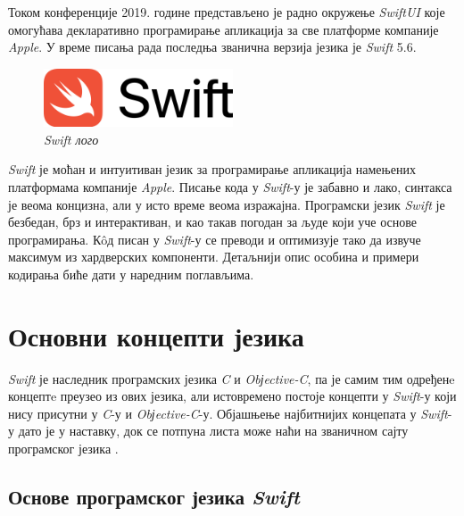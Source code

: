 \documentclass[12pt,oneside]{memoir}
\begin{document}
\indent Током конференције 2019. године представљено је радно окружење \textit{SwiftUI} \cite{Swift_SwiftUI} које омогућава декларативно програмирање апликација за све платформе компаније \textit{Apple}. У време писања рада последња званична верзија језика је \textit{Swift} 5.6.

\begin{figure}[H]
\includegraphics[width=0.5\textwidth]{images/Swift_logo.png}
\centering
\caption{\textit{Swift лого}}
\label{slika:swift_logo}
\end{figure}

\indent \textit{Swift} је моћан и интуитиван језик за програмирање апликација намењених платформама компаније \textit{Apple}. Писање кода у \textit{Swift}-у је забавно и лако, синтакса је веома концизна, али у исто време веома изражајна. Програмски језик \textit{Swift} је безбедан, брз и интерактиван, и као такав погодан за људе који уче основе програмирања. К\^{o}д писан у \textit{Swift}-у се преводи и оптимизује тако да извуче максимум из хардверских компоненти. Детаљнији опис особина и примери кодирања биће дати у наредним поглављима. 

\section{Основни концепти језика}
\label{sec:Концепти}

\indent \textit{Swift} је наследник програмских језика \textit{C} и \textit{Obјective-C}, па је самим тим одређенe концептe преузео из ових језика, али истовремено постоје концепти у \textit{Swift}-у који нису присутни у \textit{C}-у и \textit{Obјective-C}-у. Објашњење најбитнијих концепата у \textit{Swift}-у дато је у наставку, док се потпуна листа може наћи на званичном сајту програмског језика \cite{SwiftOfficialSite}.

\subsection{Основе програмског језика \textit{Swift}}
\end{document}
